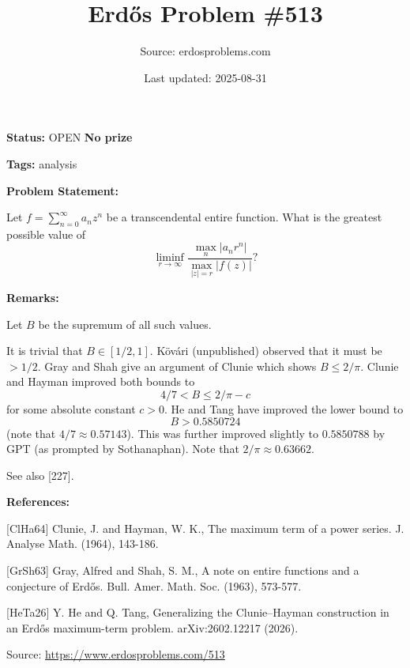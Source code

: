 \documentclass{article}
\title{Erd\H{o}s Problem \#513}
\date{Last updated: 2025-08-31}
\author{Source: erdosproblems.com}
\begin{document}
\maketitle

\noindent\textbf{Status:} OPEN \quad \textbf{No prize}

\noindent\textbf{Tags:} analysis

\medskip
\noindent\textbf{Problem Statement:}

Let $f=\sum_{n=0}^\infty a_nz^n$ be a transcendental entire function. What is the greatest possible value of\[\liminf_{r\to \infty} \frac{\max_n\lvert a_nr^n\rvert}{\max_{\lvert z\rvert=r}\lvert f(z)\rvert}?\]

\bigskip
\noindent\textbf{Remarks:}

Let $B$ be the supremum of all such values. 

It is trivial that $B\in [1/2,1]$. K\"{o}v\'{a}ri (unpublished) observed that it must be $>1/2$. Gray and Shah \cite{GrSh63} give an argument of Clunie which shows $B\leq 2/\pi$. Clunie and Hayman \cite{ClHa64} improved both bounds to\[4/7< B \leq 2/\pi-c\]for some absolute constant $c>0$. He and Tang \cite{HeTa26} have improved the lower bound to\[B> 0.5850724\](note that $4/7\approx 0.57143$). This was further improved slightly to $0.5850788$ by GPT (as prompted by Sothanaphan). Note that $2/\pi \approx 0.63662$.

See also [227].

\bigskip
\noindent\textbf{References:}

[ClHa64] Clunie, J. and Hayman, W. K., The maximum term of a power series. J. Analyse Math. (1964), 143-186.
 
 [GrSh63] Gray, Alfred and Shah, S. M., A note on entire functions and a conjecture of Erd\H{o}s. Bull. Amer. Math. Soc. (1963), 573-577.
 
 [HeTa26] Y. He and Q. Tang, Generalizing the Clunie--Hayman construction in an Erd\H{o}s maximum-term problem. arXiv:2602.12217 (2026).

\bigskip
\noindent\small{Source: \url{https://www.erdosproblems.com/513}}
\end{document}

